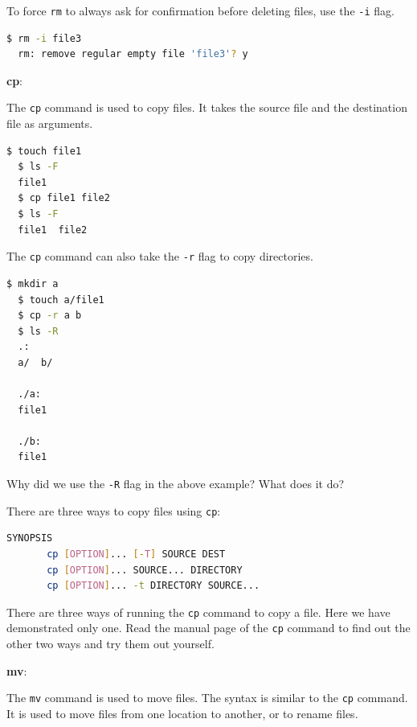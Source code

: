 To force \texttt{rm} to always ask for confirmation before deleting files, use the \texttt{-i} flag.

\begin{lstlisting}[language=bash]
  $ rm -i file3
  rm: remove regular empty file 'file3'? y
\end{lstlisting}

\textbf{cp}:

The \texttt{cp} command is used to copy files.
It takes the source file and the destination file as arguments.

\begin{lstlisting}[language=bash]
  $ touch file1
  $ ls -F
  file1
  $ cp file1 file2
  $ ls -F
  file1  file2
\end{lstlisting}

The \texttt{cp} command can also take the \texttt{-r} flag to copy directories.

\begin{lstlisting}[language=bash]
  $ mkdir a
  $ touch a/file1
  $ cp -r a b
  $ ls -R
  .:
  a/  b/

  ./a:
  file1

  ./b:
  file1
\end{lstlisting}

\begin{exercise}
  Why did we use the \texttt{-R} flag in the above example? What does it do?
\end{exercise}

There are three ways to copy files using \texttt{cp}:

\begin{lstlisting}[language=bash]
SYNOPSIS
       cp [OPTION]... [-T] SOURCE DEST
       cp [OPTION]... SOURCE... DIRECTORY
       cp [OPTION]... -t DIRECTORY SOURCE...
\end{lstlisting}

\begin{exercise}
  There are three ways of running the \texttt{cp} command to copy a file.
  Here we have demonstrated only one.
  Read the manual page of the \texttt{cp} command to find out the other two ways and try them out yourself.
\end{exercise}

\textbf{mv}:

The \texttt{mv} command is used to move files.
The syntax is similar to the \texttt{cp} command.
It is used to move files from one location to another, or to rename files.

